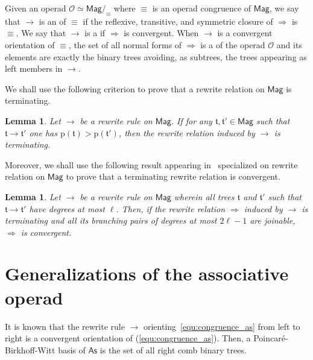 \documentclass[10pt,reqno]{amsart}
\numberwithin{equation}{subsection}
\newtheorem{Lemma}[Theorem]{Lemma}
\newcommand{\Oca}{\mathcal{O}}
\newcommand{\Tfr}{\mathfrak{t}}
\newcommand{\Mag}{\mathsf{Mag}}
\newcommand{\As}{\mathsf{As}}
\newcommand{\PrefixWord}{\mathrm{p}}
\DeclareMathOperator{\Congr}{\equiv}
\DeclareMathOperator{\Rew}{\to}
\DeclareMathOperator{\RewContext}{\Rightarrow}
\begin{document}
Given an operad $\Oca \simeq \Mag/_{\Congr}$ where $\Congr$ is an operad
congruence of $\Mag$, we say that $\Rew$ is an  of
$\Congr$ if the reflexive, transitive, and symmetric closure of
$\RewContext$ is $\Congr$. We say that $\Rew$ is a  if $\RewContext$ is convergent. When $\Rew$ is a convergent
orientation of $\Congr$, the set of all normal forms of $\RewContext$ is
a  of the operad $\Oca$ and its
elements are exactly the binary trees avoiding, as subtrees, the trees
appearing as left members in $\Rew$.

We shall use the following criterion to prove that a rewrite relation on
$\Mag$ is terminating.

\begin{Lemma}\label{lem:prefix_word_termination}
    Let $\Rew$ be a rewrite rule on $\Mag$. If for any
    $\Tfr, \Tfr' \in \Mag$ such that $\Tfr \Rew \Tfr'$ one has
    $\PrefixWord(\Tfr) > \PrefixWord(\Tfr')$, then the rewrite relation
    induced by $\Rew$ is terminating.
\end{Lemma}

Moreover, we shall use the following result appearing in~\cite{Gir16}
specialized on rewrite relation on $\Mag$ to prove that a terminating
rewrite relation is convergent.


\begin{Lemma} \label{lem:degree_confluence}
    Let $\Rew$ be a rewrite rule on $\Mag$ wherein all trees $\Tfr$ and 
    $\Tfr'$ such that $\Tfr \Rew \Tfr'$ have degrees at most $\ell$. 
    Then, if the rewrite relation $\RewContext$ induced by $\Rew$ is
    terminating and all its branching pairs of degrees at most
    $2\ell - 1$ are joinable, $\RewContext$ is convergent.
\end{Lemma}

\section{Generalizations of the associative operad} \label{sec:CAs_d}
It is known that the rewrite rule $\Rew$
orienting~\eqref{equ:congruence_as} from left to right is a convergent
orientation of (\ref{equ:congruence_as}). Then, a Poincaré-Birkhoff-Witt
basis of $\As$ is the set of all right comb binary trees.
\end{document}
